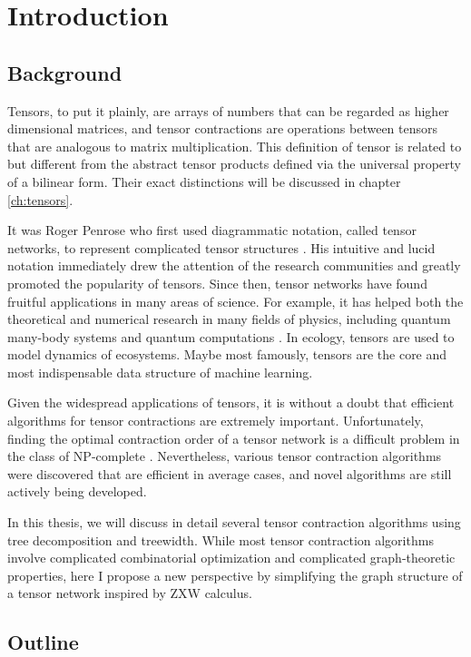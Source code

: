 \chapter{Introduction}
\section{Background}

Tensors, to put it plainly, are arrays of numbers that can be regarded as higher dimensional matrices, and tensor contractions are operations between tensors that are analogous to matrix multiplication. 
This definition of tensor is related to but different from the abstract tensor products defined via the universal property of a bilinear form. 
Their exact distinctions will be discussed in chapter \ref{ch:tensors}.

It was Roger Penrose who first used diagrammatic notation, called tensor networks, to represent complicated tensor structures \cite{penrose1971applications}. 
His intuitive and lucid notation immediately drew the attention of the research communities and greatly promoted the popularity of tensors.
Since then, tensor networks have found fruitful applications in many areas of science.
For example, it has helped both the theoretical and numerical research in many fields of physics, including quantum many-body systems and quantum computations \cite{orus2014}. 
In ecology, tensors are used to model dynamics of ecosystems. 
Maybe most famously, tensors are the core and most indispensable data structure of machine learning. 

Given the widespread applications of tensors, it is without a doubt that efficient algorithms for tensor contractions are extremely important.
Unfortunately, finding the optimal contraction order of a tensor network is a difficult problem in the class of NP-complete \cite{contraction_hard}.
Nevertheless, various tensor contraction algorithms were discovered that are efficient in average cases, and novel algorithms are still actively being developed.

In this thesis, we will discuss in detail several tensor contraction algorithms using tree decomposition and treewidth.
While most tensor contraction algorithms involve complicated combinatorial optimization and complicated graph-theoretic properties, here I propose a new perspective by simplifying the graph structure of a tensor network inspired by ZXW calculus.


\section{Outline}


